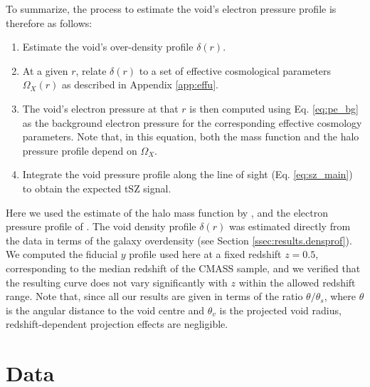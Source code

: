 \documentclass[twocolumn,amsfont,amssymb,amsmath, showpacs,balancelastpage, nofootinbib]{revtex4-1}
\begin{document}
    To summarize, the process to estimate the void's electron pressure profile is therefore as
    follows:
    \begin{enumerate}
      \item Estimate the void's over-density profile $\delta(r)$.
      \item At a given $r$, relate $\delta(r)$ to a set of effective cosmological parameters
            $\Omega_X(r)$ as described in Appendix \ref{app:effu}.
      \item The void's electron pressure at that $r$ is then computed using Eq. \ref{eq:pe_bg}
            as the background electron pressure for the corresponding effective cosmology
            parameters. Note that, in this equation, both the mass function and the halo
            pressure profile depend on $\Omega_X$.
      \item Integrate the void pressure profile along the line of sight (Eq. \ref{eq:sz_main})
            to obtain the expected tSZ signal.
    \end{enumerate}
    Here we used the estimate of the halo mass function by \cite{2010ApJ...724..878T}, and the
    electron pressure profile of \cite{2012ApJ...758...75B}. The void density profile $\delta(r)$
    was estimated directly from the data in terms of the galaxy overdensity (see Section
    \ref{ssec:results.densprof}). We computed the fiducial $y$ profile used here at a fixed
    redshift $z=0.5$, corresponding to the median redshift of the CMASS sample, and we verified
    that the resulting curve does not vary significantly with $z$ within the allowed redshift
    range. Note that, since all our results are given in terms of the ratio $\theta/\theta_s$,
    where $\theta$ is the angular distance to the void centre and $\theta_v$ is the projected
    void radius, redshift-dependent projection effects are negligible.

  \section{Data}\label{sec:data}
\end{document}
